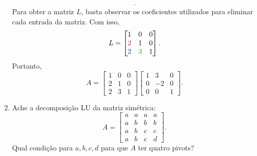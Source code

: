 \documentclass[leqno]{article}
\numberwithin{equation}{section}
\begin{document}
\begin{enumerate}
\begin{sol}
\begin{align*}
            .\end{align*}
            Para obter a matriz \( L \), basta observar os coeficientes utilizados para eliminar cada entrada da matriz.
            Com isso,
            \begin{equation*}
                L =
                \begin{bmatrix}
                    1 & 0 & 0 \\
                    {\color{myred} 2} & 1 & 0 \\
                    {\color{myblue} 2} & {\color{mygreen} 3} & 1
                \end{bmatrix}
            .\end{equation*}
            Portanto,
            \begin{equation*}
                A = 
                \begin{bmatrix}
                    1 & 0 & 0 \\
                    2 & 1 & 0 \\
                    2 & 3 & 1
                \end{bmatrix}
                \begin{bmatrix}
                    1 & 3 & 0  \\
                    0 & -2 & 0  \\
                    0 & 0 & 1 
                \end{bmatrix}
            .\end{equation*}
        \end{sol} 

    \item Ache a decomposição LU da matriz simétrica:
        $$A = 
        \begin{bmatrix}
            a & a & a & a  \\
            a & b & b & b  \\
            a & b & c & c  \\
            a & b & c & d 
        \end{bmatrix}.
        $$
        Qual condição para $a,b,c,d$ para que $A$ ter quatro pivots?


\end{enumerate}
\end{document}
